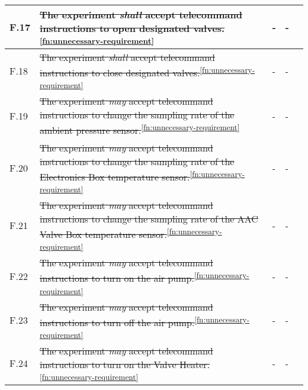 \begin{longtable}[]{|m{}| m{} |m{} |m{}|m{}|}
F.17 & \st{The experiment \textit{shall} accept telecommand instructions to open designated valves.}\textsuperscript{\ref{fn:unnecessary-requirement}}                                                                                          &      -      & -        &        \\ \hline
F.18 & \st{The experiment \textit{shall} accept telecommand instructions to close designated valves.}\textsuperscript{\ref{fn:unnecessary-requirement}}                                                                                         &      -     & -            &        \\ \hline
F.19 & \st{The experiment \textit{may} accept telecommand instructions to change the sampling rate of the ambient pressure sensor.}\textsuperscript{\ref{fn:unnecessary-requirement}}                                                           &     -         & -          &        \\ \hline
F.20 & \st{The experiment \textit{may} accept telecommand instructions to change the sampling rate of the Electronics Box temperature sensor.}\textsuperscript{\ref{fn:unnecessary-requirement}}                                                        &      -       & -            &        \\ \hline
F.21 & \st{The experiment \textit{may} accept telecommand instructions to change the sampling rate of the AAC Valve Box temperature sensor.}\textsuperscript{\ref{fn:unnecessary-requirement}}                                                  &      -       & -            &        \\ \hline
F.22 & \st{The experiment \textit{may} accept telecommand instructions to turn on the air pump.}\textsuperscript{\ref{fn:unnecessary-requirement}}                                                                                              &      -        & -            &        \\ \hline
F.23 & \st{The experiment \textit{may} accept telecommand instructions to turn off the air pump.}\textsuperscript{\ref{fn:unnecessary-requirement}}                                                                                             &      -       & -            &        \\ \hline
F.24 & \st{The experiment \textit{may} accept telecommand instructions to turn on the Valve Heater.}\textsuperscript{\ref{fn:unnecessary-requirement}}                                                                                          &      -        & -            &        \\ \hline

\end{longtable}
